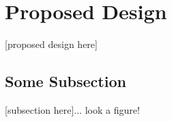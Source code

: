 \section{Proposed Design}
\label{section:propeseddesign}
[proposed design here]

\subsection{Some Subsection}
[subsection here]... look a figure!



